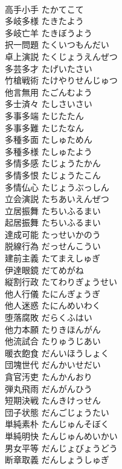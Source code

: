 \documentclass[8pt]{extreport}
\begin{document}
\begin{CJK}{UTF8}{min}
\\	高手小手	たかてこて	
\\	多岐多様	たきたよう	
\\	多岐亡羊	たきぼうよう	
\\	択一問題	たくいつもんだい	
\\	卓上演説	たくじょうえんぜつ	
\\	多芸多才	たげいたさい	
\\	竹槍戦術	たけやりせんじゅつ	
\\	他言無用	たごんむよう	
\\	多士済々	たしさいさい	
\\	多事多端	たじたたん	
\\	多事多難	たじたなん	
\\	多種多面	たしゅためん	
\\	多種多様	たしゅたよう	
\\	多情多感	たじょうたかん	
\\	多情多恨	たじょうたこん	
\\	多情仏心	たじょうぶっしん	
\\	立会演説	たちあいえんぜつ	
\\	立居振舞	たちいふるまい	
\\	起居振舞	たちいふるまい	
\\	達成可能	たっせいかのう	
\\	脱線行為	だっせんこうい	
\\	建前主義	たてまえしゅぎ	
\\	伊達眼鏡	だてめがね	
\\	縦割行政	たてわりぎょうせい	
\\	他人行儀	たにんぎょうぎ	
\\	他人迷惑	たにんめいわく	
\\	堕落腐敗	だらくふはい	
\\	他力本願	たりきほんがん	
\\	他流試合	たりゅうじあい	
\\	暖衣飽食	だんいほうしょく	
\\	団塊世代	だんかいせだい	
\\	貪官汚吏	たんかんおり	
\\	弾丸飛雨	だんがんひう	
\\	短期決戦	たんきけっせん	
\\	団子状態	だんごじょうたい	
\\	単純素朴	たんじゅんそぼく	
\\	単純明快	たんじゅんめいかい	
\\	男女平等	だんじょびょうどう	
\\	断章取義	だんしょうしゅぎ	

\end{CJK}
\end{document}
